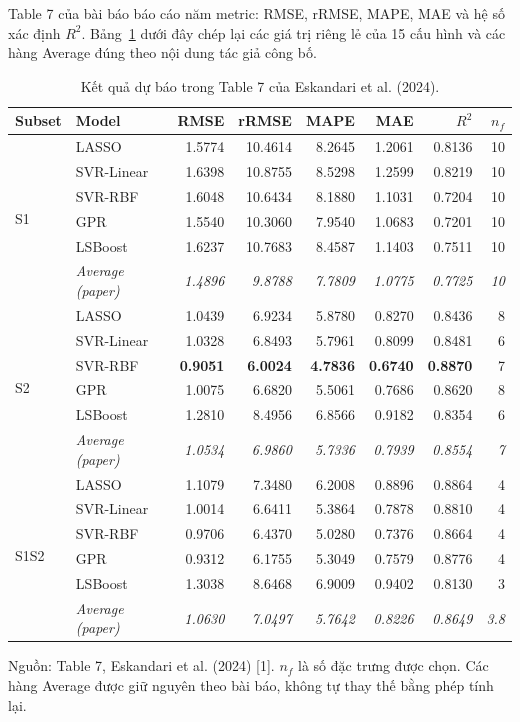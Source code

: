 Table 7 của bài báo báo cáo năm metric: RMSE, rRMSE, MAPE, MAE và hệ số xác định $R^2$. Bảng~\ref{tab:authors-table7} dưới đây chép lại các giá trị riêng lẻ của 15 cấu hình và các hàng Average đúng theo nội dung tác giả công bố.

\begin{table}[H]
\centering
\scriptsize
\caption{Kết quả dự báo trong Table 7 của Eskandari et al. (2024).}
\label{tab:authors-table7}
\begin{tabular}{llrrrrrr}
\toprule
\textbf{Subset} & \textbf{Model} & \textbf{RMSE} & \textbf{rRMSE} & \textbf{MAPE} & \textbf{MAE} & \textbf{$R^2$} & \textbf{$n_f$} \\
\midrule
\multirow{6}{*}{S1} & LASSO & 1.5774 & 10.4614 & 8.2645 & 1.2061 & 0.8136 & 10 \\
 & SVR-Linear & 1.6398 & 10.8755 & 8.5298 & 1.2599 & 0.8219 & 10 \\
 & SVR-RBF & 1.6048 & 10.6434 & 8.1880 & 1.1031 & 0.7204 & 10 \\
 & GPR & 1.5540 & 10.3060 & 7.9540 & 1.0683 & 0.7201 & 10 \\
 & LSBoost & 1.6237 & 10.7683 & 8.4587 & 1.1403 & 0.7511 & 10 \\
 & \textit{Average (paper)} & \textit{1.4896} & \textit{9.8788} & \textit{7.7809} & \textit{1.0775} & \textit{0.7725} & \textit{10} \\
\midrule
\multirow{6}{*}{S2} & LASSO & 1.0439 & 6.9234 & 5.8780 & 0.8270 & 0.8436 & 8 \\
 & SVR-Linear & 1.0328 & 6.8493 & 5.7961 & 0.8099 & 0.8481 & 6 \\
 & SVR-RBF & \textbf{0.9051} & \textbf{6.0024} & \textbf{4.7836} & \textbf{0.6740} & \textbf{0.8870} & 7 \\
 & GPR & 1.0075 & 6.6820 & 5.5061 & 0.7686 & 0.8620 & 8 \\
 & LSBoost & 1.2810 & 8.4956 & 6.8566 & 0.9182 & 0.8354 & 6 \\
 & \textit{Average (paper)} & \textit{1.0534} & \textit{6.9860} & \textit{5.7336} & \textit{0.7939} & \textit{0.8554} & \textit{7} \\
\midrule
\multirow{6}{*}{S1S2} & LASSO & 1.1079 & 7.3480 & 6.2008 & 0.8896 & 0.8864 & 4 \\
 & SVR-Linear & 1.0014 & 6.6411 & 5.3864 & 0.7878 & 0.8810 & 4 \\
 & SVR-RBF & 0.9706 & 6.4370 & 5.0280 & 0.7376 & 0.8664 & 4 \\
 & GPR & 0.9312 & 6.1755 & 5.3049 & 0.7579 & 0.8776 & 4 \\
 & LSBoost & 1.3038 & 8.6468 & 6.9009 & 0.9402 & 0.8130 & 3 \\
 & \textit{Average (paper)} & \textit{1.0630} & \textit{7.0497} & \textit{5.7642} & \textit{0.8226} & \textit{0.8649} & \textit{3.8} \\
\bottomrule
\end{tabular}
\vspace{2mm}
\parbox{0.96\textwidth}{\footnotesize Nguồn: Table 7, Eskandari et al. (2024) [1]. $n_f$ là số đặc trưng được chọn. Các hàng Average được giữ nguyên theo bài báo, không tự thay thế bằng phép tính lại.}
\end{table}

